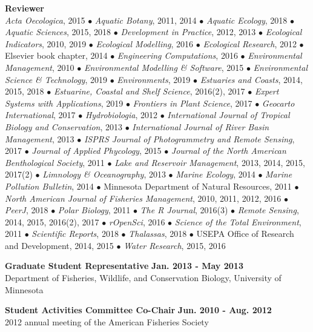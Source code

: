 \documentclass[letterpaper,12pt]{article}
\begin{document}
{\bf Reviewer}\hfill \\
\textit{Acta Oecologica}, 2015 $\bullet$ \textit{Aquatic Botany}, 2011, 2014 $\bullet$ \textit{Aquatic Ecology}, 2018 $\bullet$ \textit{Aquatic Sciences}, 2015, 2018 $\bullet$ \textit{Development in Practice}, 2012, 2013 $\bullet$ \textit{Ecological Indicators}, 2010, 2019 $\bullet$ \textit{Ecological Modelling}, 2016 $\bullet$ \textit{Ecological Research}, 2012 $\bullet$ Elsevier book chapter, 2014 $\bullet$ \textit{Engineering Computations}, 2016 $\bullet$ \textit{Environmental Management}, 2010 $\bullet$ \textit{Environmental Modelling \& Software}, 2015 $\bullet$ \textit{Environmental Science \& Technology}, 2019 $\bullet$ \textit{Environments}, 2019 $\bullet$ \textit{Estuaries and Coasts}, 2014, 2015, 2018 $\bullet$ \textit{Estuarine, Coastal and Shelf Science}, 2016(2), 2017 $\bullet$ \textit{Expert Systems with Applications}, 2019 $\bullet$ \textit{Frontiers in Plant Science}, 2017 $\bullet$ \textit{Geocarto International}, 2017 $\bullet$ \textit{Hydrobiologia}, 2012 $\bullet$ \textit{International Journal of Tropical Biology and Conservation}, 2013 $\bullet$ \textit{International Journal of River Basin Management}, 2013 $\bullet$ \textit{ISPRS Journal of Photogrammetry and Remote Sensing}, 2017 $\bullet$ \textit{Journal of Applied Phycology}, 2015 $\bullet$ \textit{Journal of the North American Benthological Society}, 2011 $\bullet$ \textit{Lake and Reservoir Management}, 2013, 2014, 2015, 2017(2) $\bullet$ \textit{Limnology \& Oceanography}, 2013 $\bullet$ \textit{Marine Ecology}, 2014 $\bullet$ \textit{Marine Pollution Bulletin}, 2014 $\bullet$ Minnesota Department of Natural Resources, 2011 $\bullet$ \textit{North American Journal of Fisheries Management}, 2010, 2011, 2012, 2016 $\bullet$ \textit{PeerJ}, 2018 $\bullet$ \textit{Polar Biology}, 2011 $\bullet$ \textit{The R Journal}, 2016(3) $\bullet$ \textit{Remote Sensing}, 2014, 2015, 2016(2), 2017 $\bullet$ \textit{rOpenSci}, 2016 $\bullet$ \textit{Science of the Total Environment}, 2011 $\bullet$ \textit{Scientific Reports}, 2018 $\bullet$ \textit{Thalassas}, 2018 $\bullet$ USEPA Office of Research and Development, 2014, 2015 $\bullet$ \textit{Water Research}, 2015, 2016

{\bf Graduate Student Representative} \hfill {\bf Jan. 2013 - May 2013} \\
Department of Fisheries, Wildlife, and Conservation Biology, University of Minnesota

{\bf Student Activities Committee Co-Chair} \hfill {\bf Jun. 2010 - Aug. 2012} \\
2012 annual meeting of the American Fisheries Society
\end{document}
